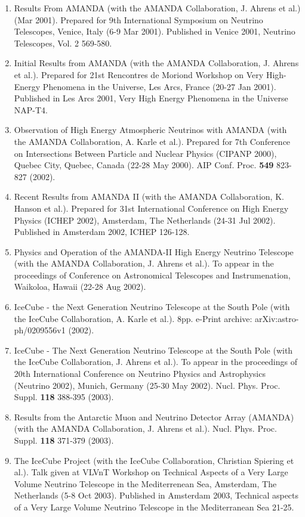 \begin{enumerate}
\item Results From AMANDA (with the AMANDA Collaboration, J. Ahrens et
  al.) (Mar 2001).  Prepared for 9th International Symposium on
  Neutrino Telescopes, Venice, Italy (6-9 Mar 2001).  Published in
  Venice 2001, Neutrino Telescopes, Vol. 2 569-580.

\item Initial Results from AMANDA (with the AMANDA Collaboration,
  J. Ahrens et al.).  Prepared for 21st Rencontres de Moriond Workshop
  on Very High-Energy Phenomena in the Universe, Les Arcs, France
  (20-27 Jan 2001).  Published in Les Arcs 2001, Very High Energy
  Phenomena in the Universe NAP-T4.

\item Observation of High Energy Atmospheric Neutrinos with AMANDA
  (with the AMANDA Collaboration, A. Karle et al.).  Prepared for 7th
  Conference on Intersections Between Particle and Nuclear Physics
  (CIPANP 2000), Quebec City, Quebec, Canada (22-28 May 2000).  AIP
  Conf. Proc. {\bf 549} 823-827 (2002).

\item Recent Results from AMANDA II (with the AMANDA Collaboration,
  K. Hanson et al.).  Prepared for 31st International Conference on
  High Energy Physics (ICHEP 2002), Amsterdam, The Netherlands (24-31
  Jul 2002). Published in Amsterdam 2002, ICHEP 126-128.

\item Physics and Operation of the AMANDA-II High Energy Neutrino
  Telescope (with the AMANDA Collaboration, J. Ahrens et al.).  To
  appear in the proceedings of Conference on Astronomical Telescopes
  and Instrumenation, Waikoloa, Hawaii (22-28 Aug 2002).

\item IceCube - the Next Generation Neutrino Telescope at the South
  Pole (with the IceCube Collaboration, A. Karle et al.).  8pp.
  e-Print archive: arXiv:astro-ph/0209556v1 (2002).

\item IceCube - The Next Generation Neutrino Telescope at the South
  Pole (with the IceCube Collaboration, J. Ahrens et al.).  To appear
  in the proceedings of 20th International Conference on Neutrino
  Physics and Astrophysics (Neutrino 2002), Munich, Germany (25-30 May
  2002).  Nucl. Phys. Proc. Suppl. {\bf 118} 388-395 (2003).

\item Results from the Antarctic Muon and Neutrino Detector Array
  (AMANDA) (with the AMANDA Collaboration, J. Ahrens et al.).
  Nucl. Phys. Proc. Suppl. {\bf 118} 371-379 (2003).
~
\item The IceCube Project (with the IceCube Collaboration, Christian
  Spiering et al.).  Talk given at VLVnT Workshop on Technical Aspects
  of a Very Large Volume Neutrino Telescope in the Mediterrenean Sea,
  Amsterdam, The Netherlands (5-8 Oct 2003). Published in Amsterdam
  2003, Technical aspects of a Very Large Volume Neutrino Telescope in
  the Mediterranean Sea 21-25.


\end{enumerate}
